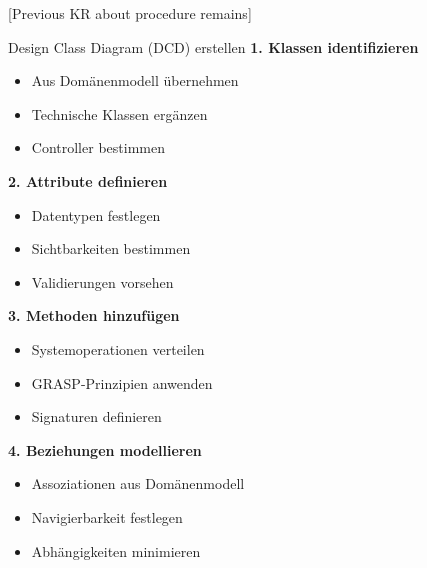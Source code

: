 [Previous KR about procedure remains]

\begin{KR}{Design Class Diagram (DCD) erstellen}
\textbf{1. Klassen identifizieren}
\begin{itemize}
    \item Aus Domänenmodell übernehmen
    \item Technische Klassen ergänzen
    \item Controller bestimmen
\end{itemize}

\textbf{2. Attribute definieren}
\begin{itemize}
    \item Datentypen festlegen
    \item Sichtbarkeiten bestimmen
    \item Validierungen vorsehen
\end{itemize}

\textbf{3. Methoden hinzufügen}
\begin{itemize}
    \item Systemoperationen verteilen
    \item GRASP-Prinzipien anwenden
    \item Signaturen definieren
\end{itemize}

\textbf{4. Beziehungen modellieren}
\begin{itemize}
    \item Assoziationen aus Domänenmodell
    \item Navigierbarkeit festlegen
    \item Abhängigkeiten minimieren
\end{itemize}
\end{KR}

